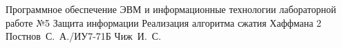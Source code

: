 \documentclass{bmstu}
\begin{document}
	
	{Программное обеспечение ЭВМ и информационные технологии}
	{лабораторной работе №5}
	{Защита информации}
	{Реализация алгоритма сжатия Хаффмана}
	{2}
	{Постнов~С.~А./ИУ7-71Б}
	{Чиж~И.~С.}
	
	\maketableofcontents
	
	
	
	
	
	
	
	\makebibliography
	
\end{document}
